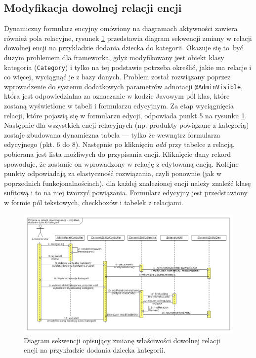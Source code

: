 \subsection{Modyfikacja dowolnej relacji encji}
Dynamiczny formularz encyjny omówiony na diagramach aktywności zawiera również pola relacyjne, rysunek \ref{zmianaWRel} przedstawia diagram sekwencji zmiany w relacji dowolnej encji na przykładzie dodania dziecka do kategorii. Okazuje się to być dużym problemem dla frameworka, gdyż modyfikowany jest obiekt klasy kategoria (\texttt{Category}) i tylko na tej podstawie potrzeba określić, jakie ma relacje i co więcej, wyciągnąć je z bazy danych. Problem został rozwiązany poprzez wprowadzenie do systemu dodatkowych parametrów adnotacji \texttt{@AdminVisible}, która jest odpowiedzialna za oznaczanie w kodzie Javowym pól klas, które zostaną wyświetlone w tabeli i formularzu edycyjnym. Za etap wyciągnięcia relacji, które pojawią się w formularzu edycji, odpowiada punkt 5 na rysunku \ref{zmianaWRel}. Następnie dla wszystkich encji relacyjnych (np. produkty powiązane z kategorią) zostaje zbudowana dynamiczna tabela — tylko że wewnątrz formularza edycyjnego (pkt. 6 do 8). Następnie po kliknięciu \textit{add} przy tabelce z relacją, pobierana jest lista możliwych do przypisania encji. Kliknięcie dany rekord spowoduje, że zostanie on wprowadzony w relację z edytowaną encją. Kolejne punkty odpowiadają za elastyczność rozwiązania, czyli ponownie (jak w poprzednich funkcjonalnościach), dla każdej znalezionej encji należy znaleźć klasę sufitową i to na niej tworzyć powiązania. Formularz edycyjny jest przedstawiony w formie pól tekstowych, checkboxów i tabelek z relacjami.
 \begin{figure}
 	\begin{center}
 		\includegraphics[scale=0.4]{zmianaWRel.png}
 	\end{center}
 	\caption{{\color{black}Diagram sekwencji opisujący zmianę właściwości dowolnej relacji encji na przykładzie dodania dziecka kategorii.}} \label{zmianaWRel}
 \end{figure}

